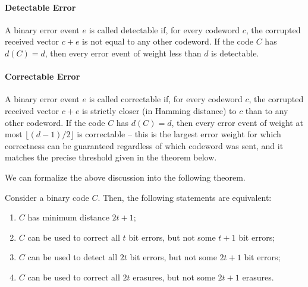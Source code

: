 \paragraph{Detectable Error} A binary error event \(e\) is called detectable if, for every codeword \(c\), the corrupted received vector \(c + e\) is not equal to any other codeword. If the code \(C\) has \(d(C)=d\), then every error event of weight less than \(d\) is detectable.  

\paragraph{Correctable Error}
A binary error event \(e\) is called correctable if, for every codeword \(c\), the corrupted received vector \(c + e\) is strictly closer (in Hamming distance) to \(c\) than to any other codeword. If the code \(C\) has \(d(C)=d\), then every error event of weight at most \(\lfloor (d-1)/2\rfloor\) is correctable -- this is the largest error weight for which correctness can be guaranteed regardless of which codeword was sent, and it matches the precise threshold given in the theorem below.

We can formalize the above discussion into the following theorem. 
\begin{theorem}
 Consider a binary code \(C\). Then, the following statements are equivalent:
\begin{enumerate}
    \item \(C\) has minimum distance \(2t + 1\);
    \item \(C\) can be used to correct all \(t\) bit errors, but not some \(t+1\) bit errors; 
    \item \(C\) can be used to detect all \(2t\) bit errors, but not some \(2t+1\) bit errors;
    \item \(C\) can be used to correct all \(2t\) erasures, but not some \(2t+1\) erasures.   
\end{enumerate}   
\end{theorem}


